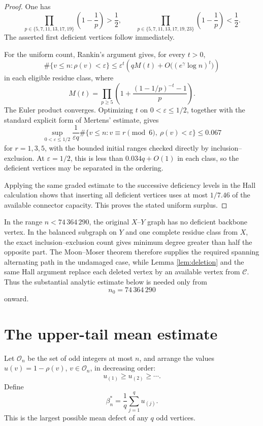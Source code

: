 \documentclass{article}
\theoremstyle{remark}
\newcommand{\Ccal}{\mathcal{C}}
\newcommand{\Ocal}{\mathcal{O}}
\begin{document}
\begin{proof}
One has
\[
 \prod_{p\in\{5,7,11,13,17,19\}}
 \left(1-\frac1p\right)>\frac12,
 \qquad
 \prod_{p\in\{5,7,11,13,17,19,23\}}
 \left(1-\frac1p\right)<\frac12.
\]
The asserted first deficient vertices follow immediately.

For the uniform count, Rankin's argument gives, for every \(t>0\),
\[
 \#\{v\leq n:\rho(v)<\varepsilon\}
 \leq
 \varepsilon^t
 \left(
  qM(t)+O\bigl((e^\gamma\log n)^t\bigr)
 \right)
\]
in each eligible residue class, where
\[
 M(t)=
 \prod_{p\geq5}
 \left(
  1+\frac{(1-1/p)^{-t}-1}{p}
 \right).
\]
The Euler product converges. Optimizing \(t\) on
\(0<\varepsilon\leq1/2\), together with the standard explicit form of
Mertens' estimate, gives
\[
 \sup_{0<\varepsilon\leq1/2}
 \frac{1}{\varepsilon q}
 \#\{v\leq n:v\equiv r\pmod 6,\ \rho(v)<\varepsilon\}
 \leq0.067
\]
for \(r=1,3,5\), with the bounded initial ranges checked directly by
inclusion--exclusion. At \(\varepsilon=1/2\), this is less than
\(0.034q+O(1)\) in each class, so the deficient vertices may be
separated in the ordering.

Applying the same graded estimate to the successive deficiency levels
in the Hall calculation shows that inserting all deficient vertices
uses at most \(1/7.46\) of the available connector capacity. This proves
the stated uniform surplus.
\end{proof}

In the range \(n<74\,364\,290\), the original \(X\)--\(Y\) graph has no
deficient backbone vertex. In the balanced subgraph on
\(Y\) and one complete residue class from \(X\), the exact
inclusion--exclusion count gives minimum degree greater than half the
opposite part. The Moon--Moser theorem \cite{MM63} therefore supplies
the required spanning alternating path in the undamaged case, while
Lemma \ref{lem:deletion} and the same Hall argument replace each
deleted vertex by an available vertex from \(\Ccal\). Thus the
substantial analytic estimate below is needed only from
\[
 n_0=74\,364\,290
\]
onward.

\section{The upper-tail mean estimate}

Let \(\Ocal_n\) be the set of odd integers at most \(n\), and arrange
the values \(u(v)=1-\rho(v)\), \(v\in\Ocal_n\), in decreasing order:
\[
 u_{(1)}\geq u_{(2)}\geq\cdots.
\]
Define
\begin{equation}\label{eq:beta-worst}
 \beta^\ast_n=\frac1q\sum_{j=1}^q u_{(j)}.
\end{equation}
This is the largest possible mean defect of any \(q\) odd vertices.
\end{document}
